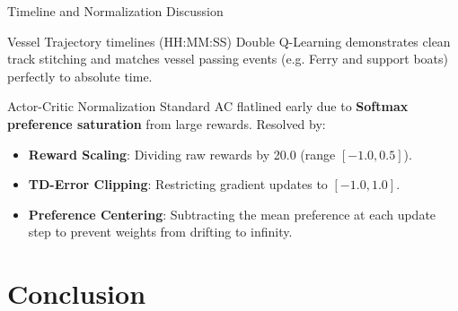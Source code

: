 \documentclass[10pt]{beamer}
\begin{document}
\begin{frame}{Timeline and Normalization Discussion}
    \begin{block}{Vessel Trajectory timelines (HH:MM:SS)}
        Double Q-Learning demonstrates clean track stitching and matches vessel passing events (e.g. Ferry and support boats) perfectly to absolute time.
    \end{block}
    
    \begin{block}{Actor-Critic Normalization}
        Standard AC flatlined early due to \textbf{Softmax preference saturation} from large rewards. Resolved by:
        \begin{itemize}
            \item \textbf{Reward Scaling}: Dividing raw rewards by 20.0 (range $[-1.0, 0.5]$).
            \item \textbf{TD-Error Clipping}: Restricting gradient updates to $[-1.0, 1.0]$.
            \item \textbf{Preference Centering}: Subtracting the mean preference at each update step to prevent weights from drifting to infinity.
        \end{itemize}
    \end{block}
\end{frame}

\section{Conclusion}
\end{document}
